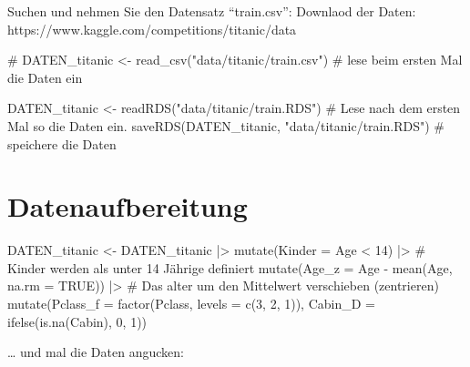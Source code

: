 \documentclass[
  10pt,
  letterpaper,
  a4paper, twoside]{scrreprt}
\newenvironment{Shaded}{\begin{snugshade}}{\end{snugshade}}
\newcommand{\AttributeTok}[1]{\textcolor[rgb]{0.40,0.45,0.13}{#1}}
\newcommand{\CommentTok}[1]{\textcolor[rgb]{0.37,0.37,0.37}{#1}}
\newcommand{\ConstantTok}[1]{\textcolor[rgb]{0.56,0.35,0.01}{#1}}
\newcommand{\DecValTok}[1]{\textcolor[rgb]{0.68,0.00,0.00}{#1}}
\newcommand{\FunctionTok}[1]{\textcolor[rgb]{0.28,0.35,0.67}{#1}}
\newcommand{\NormalTok}[1]{\textcolor[rgb]{0.00,0.23,0.31}{#1}}
\newcommand{\OtherTok}[1]{\textcolor[rgb]{0.00,0.23,0.31}{#1}}
\newcommand{\SpecialCharTok}[1]{\textcolor[rgb]{0.37,0.37,0.37}{#1}}
\newcommand{\StringTok}[1]{\textcolor[rgb]{0.13,0.47,0.30}{#1}}
\begin{document}
Suchen und nehmen Sie den Datensatz \enquote{train.csv}: Downlaod der
Daten: https://www.kaggle.com/competitions/titanic/data

\begin{Shaded}
\begin{Highlighting}[]
\CommentTok{\# DATEN\_titanic \textless{}{-} read\_csv("data/titanic/train.csv") \# lese beim ersten Mal die Daten ein}

\NormalTok{DATEN\_titanic }\OtherTok{\textless{}{-}} \FunctionTok{readRDS}\NormalTok{(}\StringTok{"data/titanic/train.RDS"}\NormalTok{) }\CommentTok{\# Lese nach dem ersten Mal so die Daten ein.}
\FunctionTok{saveRDS}\NormalTok{(DATEN\_titanic, }\StringTok{"data/titanic/train.RDS"}\NormalTok{) }\CommentTok{\# speichere die Daten}
\end{Highlighting}
\end{Shaded}

\section{Datenaufbereitung}\label{datenaufbereitung}

\begin{Shaded}
\begin{Highlighting}[]
\NormalTok{DATEN\_titanic }\OtherTok{\textless{}{-}}\NormalTok{ DATEN\_titanic }\SpecialCharTok{|\textgreater{}} 
    \FunctionTok{mutate}\NormalTok{(}\AttributeTok{Kinder =}\NormalTok{ Age }\SpecialCharTok{\textless{}} \DecValTok{14}\NormalTok{) }\SpecialCharTok{|\textgreater{}} \CommentTok{\# Kinder werden als unter 14 Jährige definiert}
    \FunctionTok{mutate}\NormalTok{(}\AttributeTok{Age\_z =}\NormalTok{ Age }\SpecialCharTok{{-}} \FunctionTok{mean}\NormalTok{(Age, }\AttributeTok{na.rm =} \ConstantTok{TRUE}\NormalTok{)) }\SpecialCharTok{|\textgreater{}} \CommentTok{\# Das alter um den Mittelwert verschieben (zentrieren)}
    \FunctionTok{mutate}\NormalTok{(}\AttributeTok{Pclass\_f =} \FunctionTok{factor}\NormalTok{(Pclass, }\AttributeTok{levels =} \FunctionTok{c}\NormalTok{(}\DecValTok{3}\NormalTok{, }\DecValTok{2}\NormalTok{, }\DecValTok{1}\NormalTok{)), }
           \AttributeTok{Cabin\_D =} \FunctionTok{ifelse}\NormalTok{(}\FunctionTok{is.na}\NormalTok{(Cabin), }\DecValTok{0}\NormalTok{, }\DecValTok{1}\NormalTok{))}
\end{Highlighting}
\end{Shaded}

\ldots{} und mal die Daten angucken:
\end{document}
